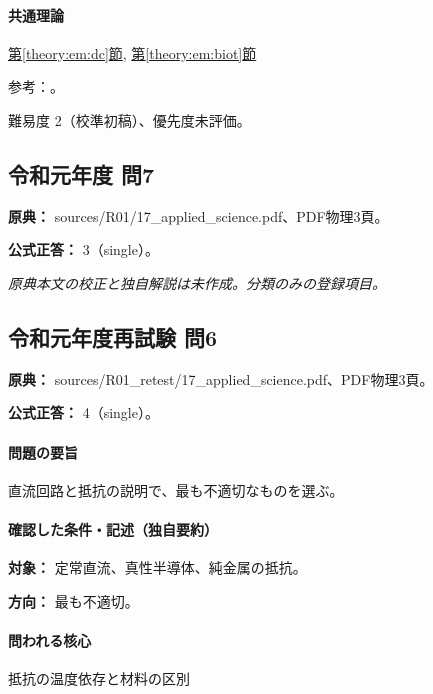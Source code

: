 \paragraph{共通理論} \hyperref[theory:em:dc]{第\ref*{theory:em:dc}節}, \hyperref[theory:em:biot]{第\ref*{theory:em:biot}節}

\par 参考：\cite{mit_em06,mit_em09}。

\par 難易度 2（校準初稿）、優先度未評価。

\subsection{令和元年度 問7}
\label{q:r01-reg-applied-07}

\noindent\textbf{原典：} sources/R01/17\_applied\_science.pdf、PDF物理3頁。

\textbf{公式正答：} 3（single）。

\par\textit{原典本文の校正と独自解説は未作成。分類のみの登録項目。}

\subsection{令和元年度再試験 問6}
\label{q:r01-ret-applied-06}

\noindent\textbf{原典：} sources/R01\_retest/17\_applied\_science.pdf、PDF物理3頁。

\textbf{公式正答：} 4（single）。

\paragraph{問題の要旨} 直流回路と抵抗の説明で、最も不適切なものを選ぶ。

\paragraph{確認した条件・記述（独自要約）}\mbox{}\par

\noindent\textbf{対象：} 定常直流、真性半導体、純金属の抵抗。\par

\noindent\textbf{方向：} 最も不適切。\par

\paragraph{問われる核心} 抵抗の温度依存と材料の区別

